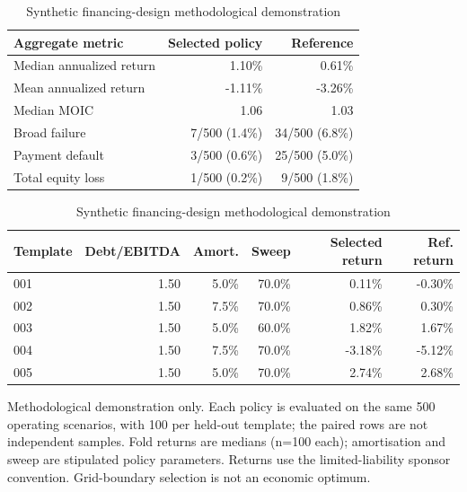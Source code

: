 \begin{table}[htbp]\centering\small
\caption{Synthetic financing-design methodological demonstration}\label{tab:T5}
\begin{tabular}{lrr}
\toprule
Aggregate metric & Selected policy & Reference \\
\midrule
Median annualized return & 1.10\% & 0.61\% \\
Mean annualized return & -1.11\% & -3.26\% \\
Median MOIC & 1.06 & 1.03 \\
Broad failure & 7/500 (1.4\%) & 34/500 (6.8\%) \\
Payment default & 3/500 (0.6\%) & 25/500 (5.0\%) \\
Total equity loss & 1/500 (0.2\%) & 9/500 (1.8\%) \\
\bottomrule
\end{tabular}
\medskip

\begin{tabular}{lrrrrr}
\toprule
Template & Debt/EBITDA & Amort. & Sweep & Selected return & Ref. return \\
\midrule
001 & 1.50 & 5.0\% & 70.0\% & 0.11\% & -0.30\% \\
002 & 1.50 & 7.5\% & 70.0\% & 0.86\% & 0.30\% \\
003 & 1.50 & 5.0\% & 60.0\% & 1.82\% & 1.67\% \\
004 & 1.50 & 7.5\% & 70.0\% & -3.18\% & -5.12\% \\
005 & 1.50 & 5.0\% & 70.0\% & 2.74\% & 2.68\% \\
\bottomrule
\end{tabular}
\par\smallskip
\begin{minipage}{\linewidth}\footnotesize Methodological demonstration only. Each policy is evaluated on the same 500 operating scenarios, with 100 per held-out template; the paired rows are not independent samples. Fold returns are medians (n=100 each); amortisation and sweep are stipulated policy parameters. Returns use the limited-liability sponsor convention. Grid-boundary selection is not an economic optimum.\end{minipage}
\end{table}
